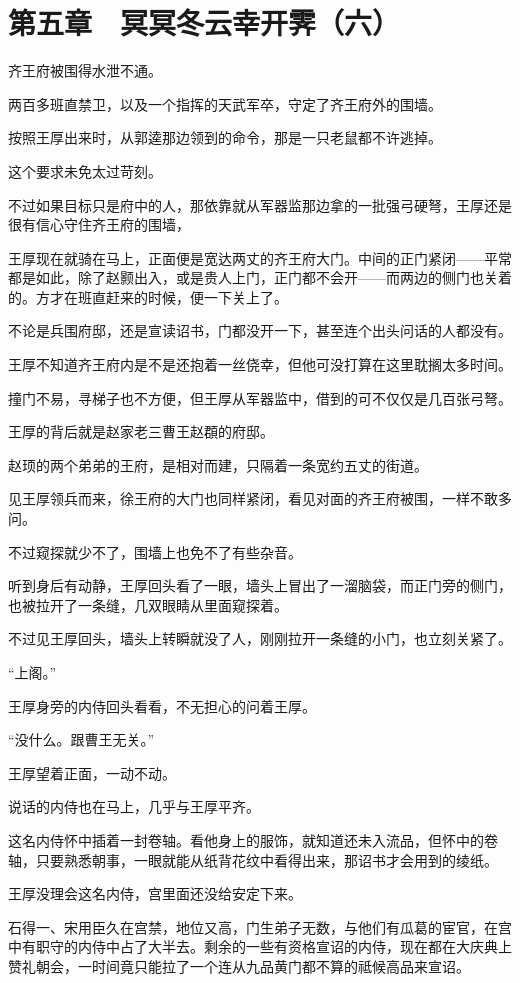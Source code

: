\section{第五章　冥冥冬云幸开霁（六）}

齐王府被围得水泄不通。

两百多班直禁卫，以及一个指挥的天武军卒，守定了齐王府外的围墙。

按照王厚出来时，从郭逵那边领到的命令，那是一只老鼠都不许逃掉。

这个要求未免太过苛刻。

不过如果目标只是府中的人，那依靠就从军器监那边拿的一批强弓硬弩，王厚还是很有信心守住齐王府的围墙，

王厚现在就骑在马上，正面便是宽达两丈的齐王府大门。中间的正门紧闭——平常都是如此，除了赵颢出入，或是贵人上门，正门都不会开——而两边的侧门也关着的。方才在班直赶来的时候，便一下关上了。

不论是兵围府邸，还是宣读诏书，门都没开一下，甚至连个出头问话的人都没有。

王厚不知道齐王府内是不是还抱着一丝侥幸，但他可没打算在这里耽搁太多时间。

撞门不易，寻梯子也不方便，但王厚从军器监中，借到的可不仅仅是几百张弓弩。

王厚的背后就是赵家老三曹王赵頵的府邸。

赵顼的两个弟弟的王府，是相对而建，只隔着一条宽约五丈的街道。

见王厚领兵而来，徐王府的大门也同样紧闭，看见对面的齐王府被围，一样不敢多问。

不过窥探就少不了，围墙上也免不了有些杂音。

听到身后有动静，王厚回头看了一眼，墙头上冒出了一溜脑袋，而正门旁的侧门，也被拉开了一条缝，几双眼睛从里面窥探着。

不过见王厚回头，墙头上转瞬就没了人，刚刚拉开一条缝的小门，也立刻关紧了。

“上阁。”

王厚身旁的内侍回头看看，不无担心的问着王厚。

“没什么。跟曹王无关。”

王厚望着正面，一动不动。

说话的内侍也在马上，几乎与王厚平齐。

这名内侍怀中插着一封卷轴。看他身上的服饰，就知道还未入流品，但怀中的卷轴，只要熟悉朝事，一眼就能从纸背花纹中看得出来，那诏书才会用到的绫纸。

王厚没理会这名内侍，宫里面还没给安定下来。

石得一、宋用臣久在宫禁，地位又高，门生弟子无数，与他们有瓜葛的宦官，在宫中有职守的内侍中占了大半去。剩余的一些有资格宣诏的内侍，现在都在大庆典上赞礼朝会，一时间竟只能拉了一个连从九品黄门都不算的祗候高品来宣诏。


